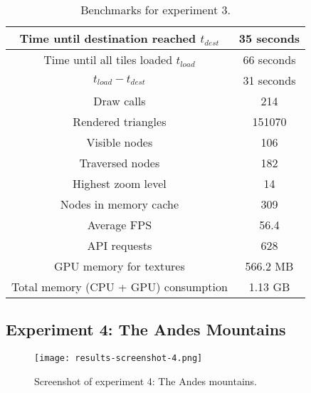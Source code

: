 \begin{table}[H]
  \begin{center}
    \begin{tabular}{ c|c }
      Time until destination reached $t_{dest}$ & 35 seconds \\
      \hline
      Time until all tiles loaded $t_{load}$ & 66 seconds \\
      \hline
      $t_{load} - t_{dest}$ & 31 seconds\\
      \hline
      Draw calls & 214 \\
      \hline
      Rendered triangles & 151070 \\
      \hline
      Visible nodes & 106 \\
      \hline
      Traversed nodes & 182 \\
      \hline
      Highest zoom level & 14 \\
      \hline
      Nodes in memory cache & 309 \\
      \hline
      Average FPS & 56.4 \\
      \hline 
      API requests & 628 \\
      \hline
      GPU memory for textures & 566.2 MB \\
      \hline
      Total memory (CPU + GPU) consumption & 1.13 GB \\
    \end{tabular}
  \end{center}
  \caption{Benchmarks for experiment 3.}\label{tbl:results-3}
  \end{table}

\subsection{Experiment 4: The Andes Mountains}
\begin{figure}[H]
  \centering
  \texttt{[image: results-screenshot-4.png]}
  \caption{Screenshot of experiment 4: The Andes mountains.}\label{fig:results-screenshot-4}
\end{figure}

